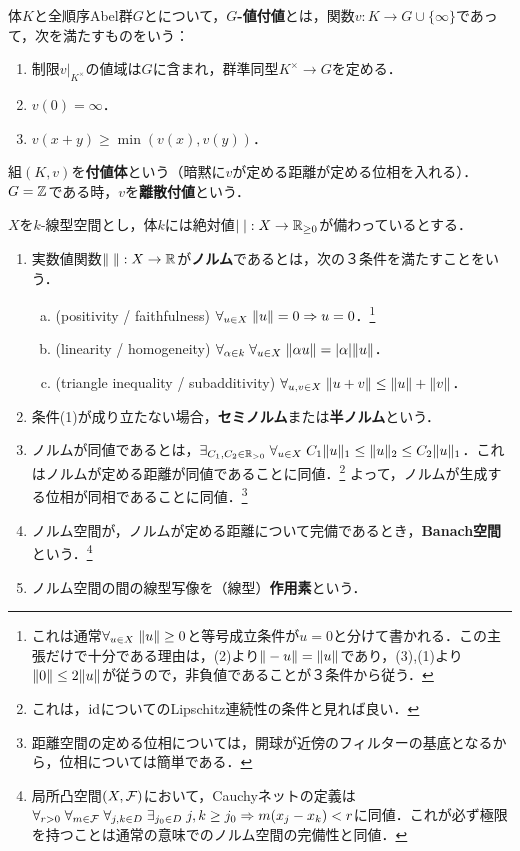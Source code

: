 \documentclass[uplatex,dvipdfmx]{jsreport}
\begin{document}
\begin{definition}
    体$K$と全順序Abel群$G$とについて，\textbf{$G$-値付値}とは，関数$v:K\to G\cup\{\infty\}$であって，次を満たすものをいう：
    \begin{enumerate}
        \item 制限$v|_{K^\times}$の値域は$G$に含まれ，群準同型$K^\times\to G$を定める．
        \item $v(0)=\infty$．
        \item $v(x+y)\ge\min(v(x),v(y))$．
    \end{enumerate}
    組$(K,v)$を\textbf{付値体}という（暗黙に$v$が定める距離が定める位相を入れる）．$G=\mathbb{Z}$である時，$v$を\textbf{離散付値}という．
\end{definition}

\begin{definition}
    $X$を$k$-線型空間とし，体$k$には絶対値$\lvert\;\rvert:X\to\mathbb{R}_{\ge 0}$が備わっているとする．
    \begin{enumerate}
        \item 実数値関数$\|\;\|:X\to\mathbb{R}$が\textbf{ノルム}であるとは，次の３条件を満たすことをいう．
        \begin{enumerate}[(a)]
            \item (positivity / faithfulness) $\forall_{u\in X}\;\|u\|=0\Rightarrow u=0$．\footnote{これは通常$\forall_{u\in X}\;\|u\|\ge 0$と等号成立条件が$u=0$と分けて書かれる．この主張だけで十分である理由は，(2)より$\|-u\|=\|u\|$であり，(3),(1)より$\|0\|\le 2\|u\|$が従うので，非負値であることが３条件から従う．}
            \item (linearity / homogeneity) $\forall_{\alpha\in k}\;\forall_{u\in X}\;\|\alpha u\|=\lvert\alpha\rvert\|u\|$．
            \item (triangle inequality / subadditivity) $\forall_{u,v\in X}\;\|u+v\|\le\|u\|+\|v\|$．
        \end{enumerate}
        \item 条件(1)が成り立たない場合，\textbf{セミノルム}または\textbf{半ノルム}という．
        \item ノルムが同値であるとは，$\exists_{C_1,C_2\in\mathbb{R}_{>0}}\;\forall_{u\in X}\;C_1\|u\|_1\le\|u\|_2\le C_2\|u\|_1$．これはノルムが定める距離が同値であることに同値．\footnote{これは，$\mathrm{id}$についてのLipschitz連続性の条件と見れば良い．}
        よって，ノルムが生成する位相が同相であることに同値．\footnote{距離空間の定める位相については，開球が近傍のフィルターの基底となるから，位相については簡単である．}
        \item ノルム空間が，ノルムが定める距離について完備であるとき，\textbf{Banach空間}という．\footnote{局所凸空間$(X,\mathcal{F})$において，Cauchyネットの定義は$\forall_{r>0}\;\forall_{m\in\mathcal{F}}\;\forall_{j,k\in D}\;\exists_{j_0\in D}\;j,k\ge j_0\Rightarrow m(x_j-x_k)<r$に同値．これが必ず極限を持つことは通常の意味でのノルム空間の完備性と同値．}
        \item ノルム空間の間の線型写像を（線型）\textbf{作用素}という．
    \end{enumerate}
\end{definition}
\end{document}
